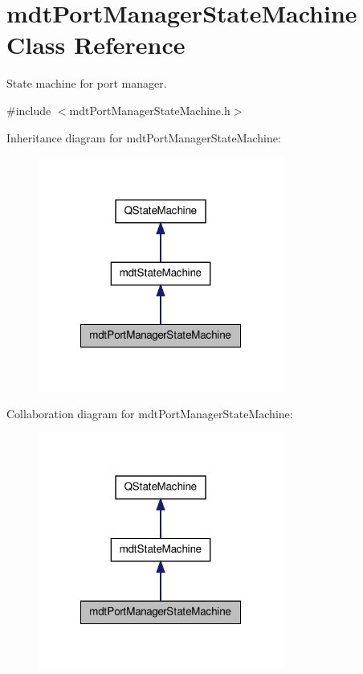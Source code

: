 \hypertarget{classmdt_port_manager_state_machine}{\section{mdt\-Port\-Manager\-State\-Machine Class Reference}
\label{classmdt_port_manager_state_machine}
}


State machine for port manager.  




{\ttfamily \#include $<$mdt\-Port\-Manager\-State\-Machine.\-h$>$}



Inheritance diagram for mdt\-Port\-Manager\-State\-Machine\-:
\nopagebreak
\begin{figure}[H]
\begin{center}
\leavevmode
\includegraphics[width=228pt]{classmdt_port_manager_state_machine__inherit__graph}
\end{center}
\end{figure}


Collaboration diagram for mdt\-Port\-Manager\-State\-Machine\-:
\nopagebreak
\begin{figure}[H]
\begin{center}
\leavevmode
\includegraphics[width=228pt]{classmdt_port_manager_state_machine__coll__graph}
\end{center}
\end{figure}
